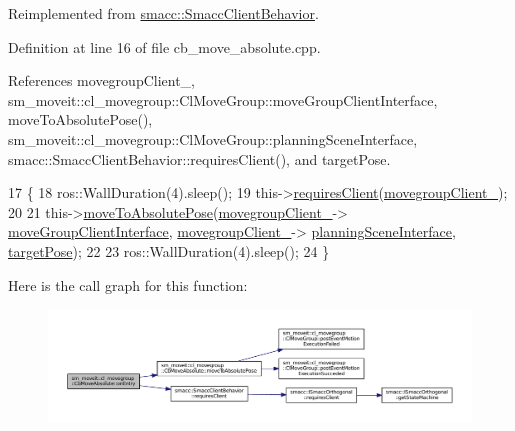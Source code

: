 Reimplemented from \hyperlink{classsmacc_1_1SmaccClientBehavior_a7962382f93987c720ad432fef55b123f}{smacc\+::\+Smacc\+Client\+Behavior}.



Definition at line 16 of file cb\+\_\+move\+\_\+absolute.\+cpp.



References movegroup\+Client\+\_\+, sm\+\_\+moveit\+::cl\+\_\+movegroup\+::\+Cl\+Move\+Group\+::move\+Group\+Client\+Interface, move\+To\+Absolute\+Pose(), sm\+\_\+moveit\+::cl\+\_\+movegroup\+::\+Cl\+Move\+Group\+::planning\+Scene\+Interface, smacc\+::\+Smacc\+Client\+Behavior\+::requires\+Client(), and target\+Pose.


\begin{DoxyCode}
17 \{
18     ros::WallDuration(4).sleep();
19     this->\hyperlink{classsmacc_1_1SmaccClientBehavior_a917f001e763a1059af337bf4e164f542}{requiresClient}(\hyperlink{classsm__moveit_1_1cl__movegroup_1_1CbMoveAbsolute_a2ccd533836053ff3d5fa689756f093fd}{movegroupClient\_});
20 
21     this->\hyperlink{classsm__moveit_1_1cl__movegroup_1_1CbMoveAbsolute_a728feab8815d609367590e235ec92f0c}{moveToAbsolutePose}(\hyperlink{classsm__moveit_1_1cl__movegroup_1_1CbMoveAbsolute_a2ccd533836053ff3d5fa689756f093fd}{movegroupClient\_}->
      \hyperlink{classsm__moveit_1_1cl__movegroup_1_1ClMoveGroup_a23acf6883455566dbab30e4367c2144d}{moveGroupClientInterface}, \hyperlink{classsm__moveit_1_1cl__movegroup_1_1CbMoveAbsolute_a2ccd533836053ff3d5fa689756f093fd}{movegroupClient\_}->
      \hyperlink{classsm__moveit_1_1cl__movegroup_1_1ClMoveGroup_a26b5c9e0aef1cd67ee977a756b69cf76}{planningSceneInterface}, \hyperlink{classsm__moveit_1_1cl__movegroup_1_1CbMoveAbsolute_aba451c75e2dfda0bc38fd043a8b24ab5}{targetPose});
22 
23     ros::WallDuration(4).sleep();
24 \}
\end{DoxyCode}


Here is the call graph for this function\+:
\nopagebreak
\begin{figure}[H]
\begin{center}
\leavevmode
\includegraphics[width=350pt]{classsm__moveit_1_1cl__movegroup_1_1CbMoveAbsolute_a25270a36013f6bda969f6f8e832053cf_cgraph}
\end{center}
\end{figure}


